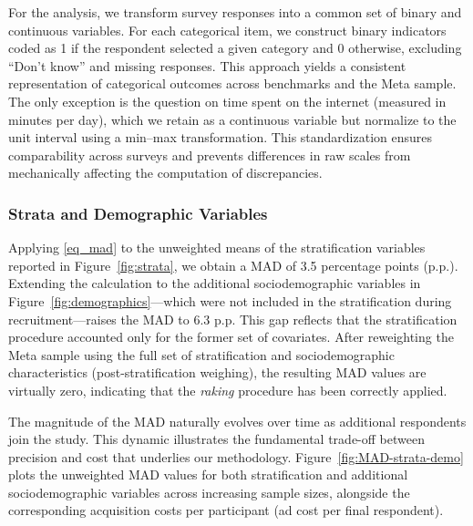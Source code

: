 For the analysis, we transform survey responses into a common set of binary and continuous variables. For each categorical item, we construct binary indicators coded as 1 if the respondent selected a given category and 0 otherwise, excluding ``Don’t know'' and missing responses. This approach yields a consistent representation of categorical outcomes across benchmarks and the Meta sample. The only exception is the question on time spent on the internet (measured in minutes per day), which we retain as a continuous variable but normalize to the unit interval using a min–max transformation. This standardization ensures comparability across surveys and prevents differences in raw scales from mechanically affecting the computation of discrepancies.







\subsubsection{Strata and Demographic Variables}
Applying \eqref{eq_mad} to the unweighted means of the stratification variables reported in Figure~\ref{fig:strata}, we obtain a MAD of 3.5 percentage points (p.p.). Extending the calculation to the additional sociodemographic variables in Figure~\ref{fig:demographics}—which were not included in the stratification during recruitment—raises the MAD to 6.3 p.p. This gap reflects that the stratification procedure accounted only for the former set of covariates.
After reweighting the Meta sample using the full set of stratification and sociodemographic characteristics (post-stratification weighing), the resulting MAD values are virtually zero, indicating that the \textit{raking} procedure has been correctly applied. 

The magnitude of the MAD naturally evolves over time as additional respondents join the study. This dynamic illustrates the fundamental trade-off between precision and cost that underlies our methodology. Figure~\ref{fig:MAD-strata-demo} plots the unweighted MAD values for both stratification and additional sociodemographic variables across increasing sample sizes, alongside the corresponding acquisition costs per participant (ad cost per final respondent).

